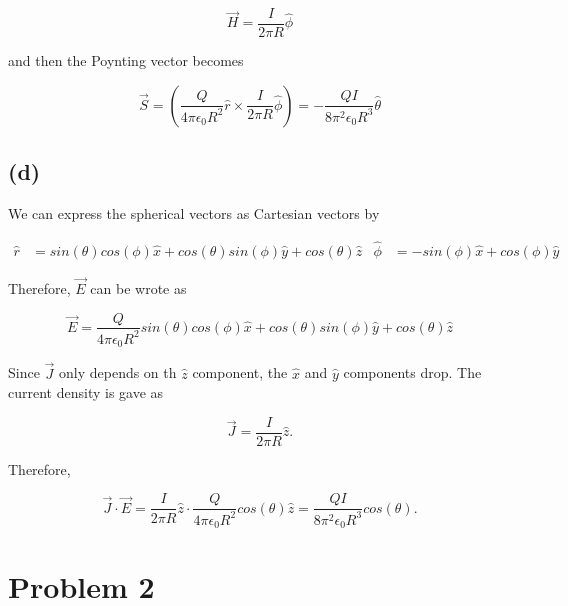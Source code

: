 \documentclass[11pt]{article}
\begin{document}
$$
\vec{H} = \frac{I}{2\pi R} \hat{\phi}
$$

and then the Poynting vector becomes

$$
\vec{S} = (\frac{Q}{4\pi\epsilon_{0}R^{2}}\hat{r} \times \frac{I}{2\pi R} \hat{\phi}) = - \frac{QI}{8\pi^{2} \epsilon_{0} R^{3}} \hat{\theta}
$$

\subsection*{(d)}

We can express the spherical vectors as Cartesian vectors by

\begin{align*}
\hat{r} &= sin(\theta) cos(\phi) \hat{x} + cos(\theta) sin(\phi) \hat{y} + cos(\theta) \hat{z}&
\hat{\phi} & = -sin(\phi) \hat{x} + cos(\phi) \hat{y}
\end{align*}

Therefore, $\vec{E}$ can be wrote as

$$
\vec{E} = \frac{Q}{4\pi\epsilon_{0}R^{2}}sin(\theta) cos(\phi) \hat{x} + cos(\theta) sin(\phi) \hat{y} + cos(\theta) \hat{z}
$$

Since $\vec{J}$ only depends on th $\hat{z}$ component, the $\hat{x}$ and $\hat{y}$ components drop. The current density is gave as 

$$
\vec{J} = \frac{I}{2\pi R} \hat{z}.
$$

Therefore,

$$
\vec{J} \cdot \vec{E} =
 \frac{I}{2\pi R} \hat{z} \cdot \frac{Q}{4\pi\epsilon_{0}R^{2}}cos(\theta) \hat{z} = \frac{QI}{8\pi^{2} \epsilon_{0} R^{3}} cos(\theta).
$$









\clearpage

\section*{Problem 2}
\end{document}
